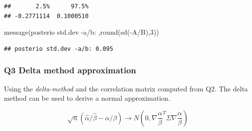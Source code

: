 \documentclass[
]{book}
\newenvironment{Shaded}{\begin{snugshade}}{\end{snugshade}}
\newcommand{\DecValTok}[1]{\textcolor[rgb]{0.00,0.00,0.81}{#1}}
\newcommand{\FunctionTok}[1]{\textcolor[rgb]{0.00,0.00,0.00}{#1}}
\newcommand{\NormalTok}[1]{#1}
\newcommand{\SpecialCharTok}[1]{\textcolor[rgb]{0.00,0.00,0.00}{#1}}
\newcommand{\StringTok}[1]{\textcolor[rgb]{0.31,0.60,0.02}{#1}}
\theoremstyle{definition}
\theoremstyle{definition}
\theoremstyle{definition}
\theoremstyle{definition}
\theoremstyle{remark}
\begin{document}
\begin{verbatim}
##       2.5%      97.5% 
## -0.2771114  0.1000510
\end{verbatim}

\begin{Shaded}
\begin{Highlighting}[]
 \FunctionTok{message}\NormalTok{(}\StringTok{\textquotesingle{}posterio std.dev {-}a/b: \textquotesingle{}}\NormalTok{,}\FunctionTok{round}\NormalTok{(}\FunctionTok{sd}\NormalTok{(}\SpecialCharTok{{-}}\NormalTok{A}\SpecialCharTok{/}\NormalTok{B),}\DecValTok{3}\NormalTok{))}
\end{Highlighting}
\end{Shaded}

\begin{verbatim}
## posterio std.dev -a/b: 0.095
\end{verbatim}

\hypertarget{q3-delta-method-approximation}{%
\subsubsection*{Q3 Delta method approximation}\label{q3-delta-method-approximation}}

Using the \emph{delta-method} and the correlation matrix computed from Q2. The delta method can be used to derive a normal approximation.

\begin{equation}
\sqrt{n}(\hat{\alpha}/\hat{\beta}-\alpha/\beta) \to N(0, \nabla \frac{\alpha}{\beta}^T \Sigma \nabla \frac{\alpha}{\beta})
\end{equation}
\end{document}
